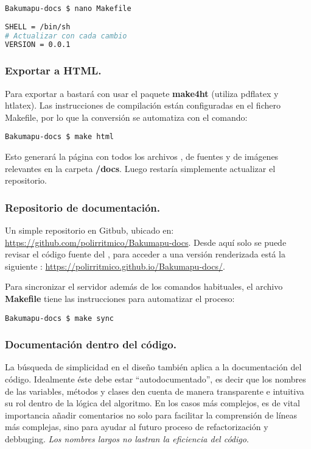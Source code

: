 \begin{lstlisting}
Bakumapu-docs $ nano Makefile
\end{lstlisting}
\begin{lstlisting}[language=bash]
SHELL = /bin/sh
# Actualizar con cada cambio
VERSION = 0.0.1
\end{lstlisting}

\subsubsection{Exportar a HTML.}\label{flujo:exportar-a-html}
Para exportar a  bastará con usar el paquete \textbf{make4ht} (utiliza pdflatex y htlatex). Las instrucciones de compilación están configuradas en el fichero Makefile, por lo que la conversión se automatiza con el comando:
\begin{lstlisting}
Bakumapu-docs $ make html
\end{lstlisting}
Esto generará la página  con todos los archivos , de fuentes y de imágenes relevantes en la carpeta \textbf{/docs}. Luego restaría simplemente actualizar el repositorio.

\subsubsection{Repositorio de documentación.}\label{flujo:repositorio-de-documentacion}
Un simple repositorio  en Gitbub, ubicado en: \url{https://github.com/polirritmico/Bakumapu-docs}. Desde aquí solo se puede revisar el código fuente del , para acceder a una versión renderizada está la siguiente : \url{https://polirritmico.github.io/Bakumapu-docs/}.

Para sincronizar el servidor además de los comandos  habituales, el archivo \textbf{Makefile} tiene las instrucciones para automatizar el proceso:
\begin{lstlisting}
Bakumapu-docs $ make sync
\end{lstlisting}

\subsubsection{Documentación dentro del código.}\label{flujo:documentacion-en-codigo}
La búsqueda de simplicidad en el diseño también aplica a la documentación del código. Idealmente éste debe estar “autodocumentado”, es decir que los nombres de las variables, métodos y clases den cuenta de manera transparente e intuitiva su rol dentro de la lógica del algoritmo. En los casos más complejos, es de vital importancia añadir comentarios no solo para facilitar la comprensión de líneas más complejas, sino para ayudar al futuro proceso de refactorización y debbuging. \emph{Los nombres largos no lastran la eficiencia del código}.

